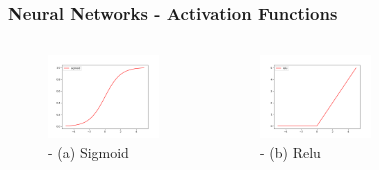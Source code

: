 \documentclass{beamer}
\begin{document}
\begin{frame}
\frametitle{Neural Networks - Activation Functions}
\begin{columns}
\centering
\begin{figure}
\includegraphics[scale=0.2]{sigmoid.png}
\caption{ - (a) Sigmoid}
\end{figure}
\centering
\begin{figure}
\includegraphics[scale=0.2]{relu.png}
\caption{ - (b) Relu}
\end{figure}
\centering
\begin{figure}

\end{figure}
\end{columns}
\end{frame}
\end{document}
